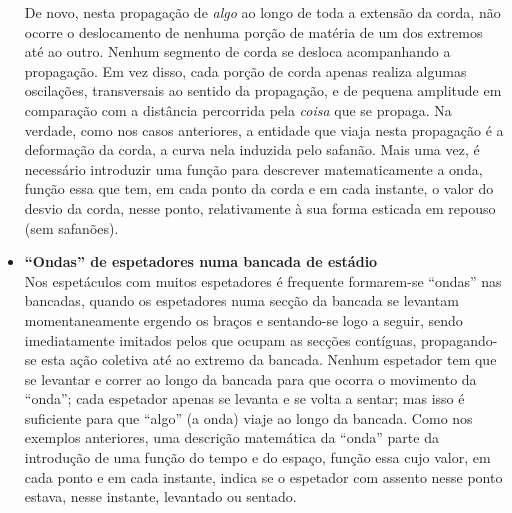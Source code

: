 \begin{itemize}
    De novo, nesta propagação de \emph{algo} ao longo de toda a extensão da
    corda, não ocorre o deslocamento de nenhuma porção de matéria de um dos
    extremos até ao outro. Nenhum segmento de corda se desloca acompanhando a
    propagação. Em vez disso, cada porção de corda apenas realiza algumas
    oscilações, transversais ao sentido da propagação, e de pequena amplitude em
    compa\-ração com a distância percorrida pela \emph{coisa} que se propaga. Na
    verdade, como nos casos anteriores, a entidade que viaja nesta propagação é
    a deformação da corda, a curva nela induzida pelo safanão. Mais uma vez, é
    necessário introduzir uma função para descrever matematicamente a onda,
    função essa que tem, em cada ponto da corda e em cada instante, o valor do
    desvio da corda, nesse ponto, relativamente à sua forma esticada em repouso
    (sem safanões).

\item \textbf{``Ondas'' de espetadores numa bancada de estádio}\\
Nos espetáculos com muitos espetadores é frequente formarem-se ``ondas''
nas bancadas, quando os espetadores numa secção da bancada se levantam
momentaneamente ergendo os braços e sentando-se logo a seguir, sendo
imediatamente imitados pelos que ocupam as secções contíguas, propagando-se esta
ação coletiva até ao extremo da bancada. Nenhum espetador tem que se levantar e
correr ao longo da bancada para que ocorra o movimento da ``onda''; cada
espetador apenas se levanta e se volta a sentar; mas isso é suficiente para que
``algo'' (a onda) viaje ao longo da bancada. Como nos exemplos anteriores, uma
descrição matemática da ``onda'' parte da introdução de uma função do tempo e do
espaço, função essa cujo valor, em cada ponto e em cada instante, indica se o
espetador com assento nesse ponto estava, nesse instante, levantado ou sentado.
\end{itemize}

